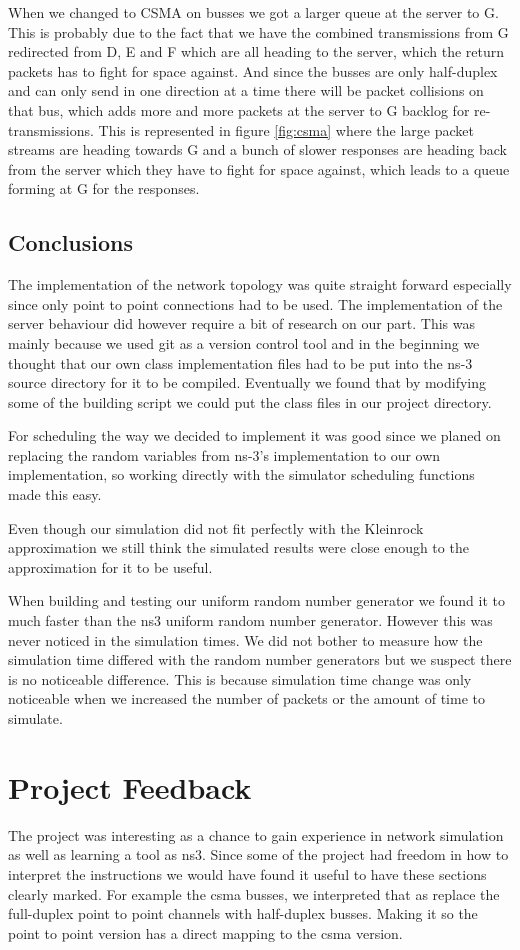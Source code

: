 \documentclass{article}
\begin{document}
When we changed to CSMA on busses we got a larger queue at the server to G. This is probably due
to the fact that we have the combined transmissions from G redirected from D, E and F which are 
all heading to the server, which the return packets has to fight for space against. And since the
busses are only half-duplex and can only send in one direction at a time there will be packet 
collisions on that bus, which adds more and more packets at the server to G backlog for re-transmissions.
This is represented in figure \ref{fig:csma} where the large packet streams are heading towards G and a bunch 
of slower responses are heading back from the server which they have to fight for space against, which 
leads to a queue forming at G for the responses.

\subsection{Conclusions}
The implementation of the network topology was quite straight forward especially since only point to point connections had to be used.
The implementation of the server behaviour did however require a bit of research on our part.
This was mainly because we used git as a version control tool and in the beginning we thought that our own class implementation files had to be put into the ns-3 source directory for it to be compiled.
Eventually we found that by modifying some of the building script we could put the class files in our project directory.

For scheduling the way we decided to implement it was good since we planed on replacing the random variables from ns-3's implementation to our own implementation, so working directly with the simulator scheduling functions made this easy.

Even though our simulation did not fit perfectly with the Kleinrock approximation we still think the simulated results were close enough to the approximation for it to be useful.

When building and testing our uniform random number generator we found it to much faster than the ns3 uniform random number generator.
However this was never noticed in the simulation times.
We did not bother to measure how the simulation time differed with the random number generators but we suspect there is no noticeable difference.
This is because simulation time change was only noticeable when we increased the number of packets or the amount of time to simulate.

\section{Project Feedback}
The project was interesting as a chance to gain experience in network simulation as well as learning a tool as ns3.
Since some of the project had freedom in how to interpret the instructions we would have found it useful to have these sections clearly marked.
For example the csma busses, we interpreted that as replace the full-duplex point to point channels with half-duplex busses.
Making it so the point to point version has a direct mapping to the csma version.

\newpage


\end{document}

